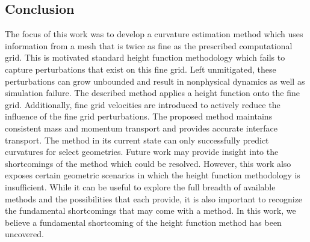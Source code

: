 \subsection{Conclusion}
The focus of this work was to develop a curvature estimation method which uses information from a mesh that is twice as fine as the prescribed computational grid. This is motivated standard height function methodology which fails to capture perturbations that exist on this fine grid. Left unmitigated, these perturbations can grow unbounded and result in nonphysical dynamics as well as simulation failure. The described method applies a height function onto the fine grid. Additionally, fine grid velocities are introduced to actively reduce the influence of the fine grid perturbations. The proposed method maintains consistent mass and momentum transport and provides accurate interface transport. The method in its current state can only successfully predict curvatures for select geometries. Future work may provide insight into the shortcomings of the method which could be resolved.  However, this work also exposes certain geometric scenarios in which the height function methodology is insufficient. While it can be useful to explore the full breadth of available methods and the possibilities that each provide, it is also important to recognize the fundamental shortcomings that may come with a method. In this work, we believe a fundamental shortcoming of the height function method has been uncovered. 

